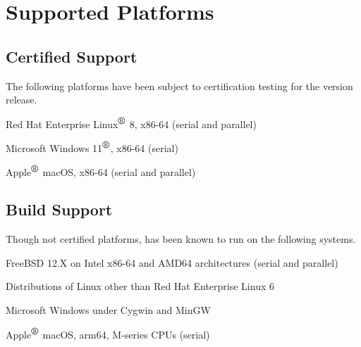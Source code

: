 \documentclass[letterpaper]{scrartcl}
\begin{document}
\newpage
\section{Supported Platforms}
\subsection*{Certified Support}
The following platforms have been subject to certification testing for the
\Xyce{} version \XyceVersionVar{} release.
\begin{XyceItemize}
  \item Red Hat Enterprise Linux${}^{\mbox{\textregistered}}$ 8, x86-64 (serial and parallel)
  \item Microsoft Windows 11${}^{\mbox{\textregistered}}$, x86-64 (serial)
  \item Apple${}^{\mbox{\textregistered}}$ macOS, x86-64 (serial and parallel)
\end{XyceItemize}


\subsection*{Build Support}
Though not certified platforms, \Xyce{} has been known to run on the following
systems.
\begin{XyceItemize}
  \item FreeBSD 12.X on Intel x86-64 and AMD64 architectures (serial
    and parallel)
  \item Distributions of Linux other than Red Hat Enterprise Linux 6
  \item Microsoft Windows under Cygwin and MinGW
  \item Apple${}^{\mbox{\textregistered}}$ macOS, arm64, M-series CPUs (serial)
\end{XyceItemize}
\end{document}
